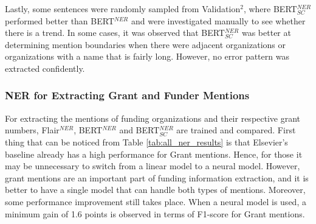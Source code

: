 \documentclass{report}
\theoremstyle{definition}
\theoremstyle{remark}
\begin{document}
Lastly, some sentences were randomly sampled from Validation$^2$, where BERT$^{NER}_{SC}$ performed better than BERT$^{NER}$ and were investigated manually to see whether there is a trend. In some cases, it was observed that BERT$^{NER}_{SC}$ was better at determining mention boundaries when there were adjacent organizations or organizations with a name that is fairly long. However, no error pattern was extracted confidently.
\newline
\begin{center}
\end{center}

\subsubsection{NER for Extracting Grant and Funder Mentions}
For extracting the mentions of funding organizations and their respective grant numbers, Flair$^{NER}$, BERT$^{NER}$ and BERT$^{NER}_{SC}$ are trained and compared. First thing that can be noticed from Table \ref{tab:all_ner_results} is that Elsevier's baseline already has a high performance for Grant mentions. Hence, for those it may be unnecessary to switch from a linear model to a neural model. However, grant mentions are an important part of funding information extraction, and it is better to have a single model that can handle both types of mentions. Moreover, some performance improvement still takes place. When a neural model is used, a minimum gain of 1.6 points is observed in terms of F1-score for Grant mentions.
\end{document}
